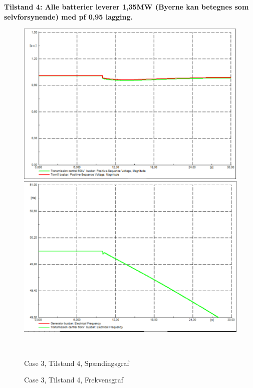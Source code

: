 \textbf{Tilstand 4: Alle batterier leverer 1,35MW (Byerne kan betegnes som selvforsynende) med pf 0,95 lagging.}
\begin{figure}[H]
	\centering
	\begin{minipage}[b]{0.48\textwidth}
		\centering
		\includegraphics[width=1.00\textwidth]{figurer/LargeDisturbance/Voltage4} %
	\end{minipage}
	\hfill
	\begin{minipage}[b]{0.48\textwidth}
		\centering
		\includegraphics[width=1.00\textwidth]{figurer/LargeDisturbance/Freq4} %
	\end{minipage}
	\\ %
	\begin{minipage}[t]{0.48\textwidth}
		\caption{Case 3, Tilstand 4, Spændingsgraf} %
		\label{fig:C3T4V}
	\end{minipage}
	\hfill
	\begin{minipage}[t]{0.48\textwidth}
		\caption{Case 3, Tilstand 4, Frekvensgraf} %
		\label{fig:C3T4F}
	\end{minipage}
\end{figure}

